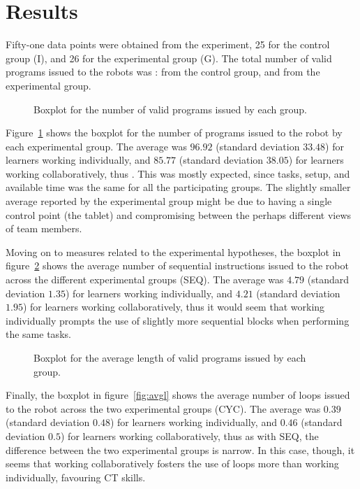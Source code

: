 \section{Results}
Fifty-one data points were obtained from the experiment, 25 for the control group (I), and 26 for the experimental group (G). The total number of valid programs issued to the robots was :  from the control group, and  from the experimental group.

\begin{figure}[ht!]
  \centering
  
  \caption{Boxplot for the number of valid programs issued by each group.}\label{fig:programs}
\end{figure}

Figure~\ref{fig:programs} shows the boxplot for the number of programs issued to the robot by each experimental group. The average was \(96.92\) (standard deviation \(33.48\)) for learners working individually, and \(85.77\) (standard deviation \(38.05\)) for learners working collaboratively, thus . This was mostly expected, since tasks, setup, and available time was the same for all the participating groups. The slightly smaller average reported by the experimental group might be due to having a single control point (the tablet) and compromising between the perhaps different views of team members.

Moving on to measures related to the experimental hypotheses, the boxplot in figure~\ref{fig:avgs} shows the average number of sequential instructions issued to the robot across the different experimental groups (SEQ). The average was \(4.79\) (standard deviation \(1.35\)) for learners working individually, and \(4.21\) (standard deviation \(1.95\)) for learners working collaboratively, thus it would seem that working individually prompts the use of slightly more sequential blocks when performing the same tasks.

\begin{figure}[ht!]
  \centering
  
  \caption{Boxplot for the average length of valid programs issued by each group.}\label{fig:avgs}
\end{figure}

Finally, the boxplot in figure~\ref{fig:avgl} shows the average number of loops issued to the robot across the two experimental groups (CYC). The average was \(0.39\) (standard deviation \(0.48\)) for learners working individually, and \(0.46\) (standard deviation \(0.5\)) for learners working collaboratively, thus as with SEQ, the difference between the two experimental groups is narrow. In this case, though, it seems that working collaboratively fosters the use of loops more than working individually, favouring \ac{CT} skills.

